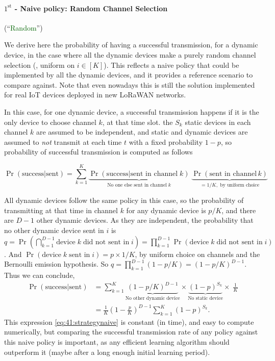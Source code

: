 \paragraph{$1^{\text{st}}$ - Naive policy: Random Channel Selection} (``\textcolor{darkgreen}{Random}'')

We derive here the probability of having a successful transmission, for a dynamic device, in the case where all the dynamic devices make a purely random channel selection (\ie, uniform on $i \in [K]$).
This reflects a naive policy that could be implemented by all the dynamic devices, and it provides a reference scenario to compare against.
Note that even nowadays this is still the solution implemented for real IoT devices deployed in new LoRaWAN networks.

In this case, for one dynamic device, a successful transmission happens if it is the only device to choose channel $k$, at that time slot.
the $S_k$ static devices in each channel $k$ are assumed to be independent, and static and dynamic devices are assumed to \emph{not} transmit at each time $t$ with a fixed probability $1-p$,
so probability of successful transmission is computed as follows

\begin{equation}
    \Pr(\text{success}|\text{sent}) = \sum_{k=1}^{K} \underbrace{\Pr(\text{success}|\text{sent in channel}\;k)}_{\text{No one else sent in channel}\; k} \; \underbrace{\Pr(\text{sent in channel}\,k)}_{= 1/K, \text{ by uniform choice}}
\end{equation}

All dynamic devices follow the same policy in this case, so the probability of transmitting at that time in channel $k$ for any dynamic device is $p / K$, and there are $D-1$ other dynamic devices.
As they are independent, the probability that no other dynamic device sent in $i$
is $q = \Pr(\bigcap_{k=1}^{D-1} \text{device}\;k\;\text{did not sent in}\;i) = \prod_{k=1}^{D-1} \Pr(\text{device}\;k\;\text{did not sent in}\;i)$. And $\Pr(\text{device}\;k\;\text{sent in}\;i) = p \times 1 / K$, by uniform choice on channels and the Bernoulli emission hypothesis. So $q = \prod_{k=1}^{D-1} (1 - p/K) = (1-p/K)^{D-1}$. Thus we can conclude,
%
\begin{align}\label{eq:41:strategynaive}
    \Pr(\text{success}|\text{sent})
    & = \sum_{k=1}^{K} \underbrace{(1 - p / K)^{D-1}}_{\text{No other dynamic device}} \times \underbrace{(1-p)^{S_k}}_{\text{No static device}} \times\; \frac{1}{K} \nonumber \\
    & = \frac{1}{K} \left(1-\frac{p}{K}\right)^{D-1} \sum_{k=1}^{K} (1-p)^{S_k} .
\end{align}
%
This expression \eqref{eq:41:strategynaive} is constant (in time), and easy to compute numerically, but comparing the successful transmission rate of any policy against this naive policy is important, as any efficient learning algorithm should outperform it
(maybe after a long enough initial learning period).


